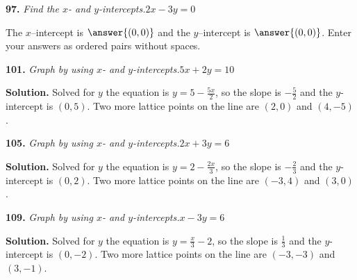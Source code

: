 \documentclass{ximera}
\begin{document}
\begin{problem}
\textbf{97.} \emph{Find the $x$- and $y$-intercepts.}\quad $2x - 3y = 0$

The \(x\)--intercept is $\answer{(0,0)}$ and the \(y\)--intercept is $\answer{(0,0)}$. 
Enter your answers as ordered pairs without spaces.
\end{problem}

\begin{problem}
\textbf{101.} \emph{Graph by using $x$- and $y$-intercepts.}\quad $5x + 2y = 10$ \figbox{\gridsm}

\begin{hint}
\textbf{Solution.} Solved for $y$ the equation is $y=5 -\frac{5x}{2}$, so the slope is $-\frac{5}{2}$ and the $y$-intercept is $(0,5)$. Two more lattice points on the line are $(2,0)$ and $(4,-5)$.
\end{hint}
\end{problem}

\begin{problem}
\textbf{105.} \emph{Graph by using $x$- and $y$-intercepts.}\quad $2x + 3y = 6$  \figbox{\gridsm}

\begin{hint}
\textbf{Solution.} Solved for $y$ the equation is $y=2 -\frac{2x}{3}$, so the slope is $-\frac{2}{3}$ and the $y$-intercept is $(0,2)$. Two more lattice points on the line are $(-3,4)$ and $(3,0)$.
\end{hint}
\end{problem}

\begin{problem}
\textbf{109.} \emph{Graph by using $x$- and $y$-intercepts.}\quad $x - 3y = 6$   \figbox{\gridsm}

\begin{hint}
\textbf{Solution.} Solved for $y$ the equation is $y=\frac{x}{3} - 2$, so the slope is $\frac{1}{3}$ and the $y$-intercept is $(0,-2)$. Two more lattice points on the line are $(-3,-3)$ and $(3,-1)$.
\end{hint}
\end{problem}
\end{document}
